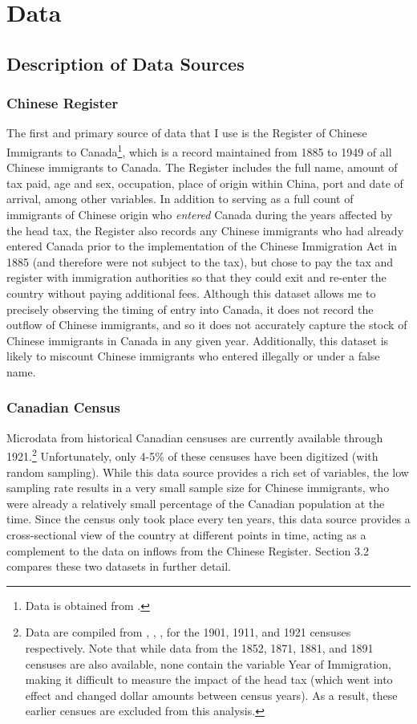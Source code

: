 \section{Data}
\subsection{Description of Data Sources}

\subsubsection{Chinese Register}
The first and primary source of data that I use is the Register of Chinese Immigrants to Canada\footnote{Data is obtained from \citet{chineseregister}.}, 
which is a record maintained from 1885 to 1949 of all Chinese immigrants to Canada.
The Register includes the full name, amount of tax paid, age and sex, occupation, place of origin within China, port and date of arrival, among other variables. 
In addition to serving as a full count of immigrants of Chinese origin who \textit{entered} Canada during the years affected by the head tax,
the Register also records any Chinese immigrants who had already entered Canada prior to the implementation of the Chinese Immigration Act in 1885 (and therefore were not subject to the tax),
but chose to pay the tax and register with immigration authorities so that they could exit and re-enter the country without paying additional fees.
Although this dataset allows me to precisely observing the timing of entry into Canada, it does not record the outflow of Chinese immigrants, and so it does not accurately capture the stock of Chinese immigrants in Canada in any given year.
Additionally, this dataset is likely to miscount Chinese immigrants who entered illegally or under a false name.

\subsubsection{Canadian Census}
Microdata from historical Canadian censuses are currently available through 1921.\footnote{Data are compiled from \citet{census1901}, \citet{census1911}, \citet{census1921}, for the 1901, 1911, and 1921 censuses respectively. Note that while data from the 1852, 1871, 1881, and 1891 censuses are also available, none contain the variable Year of Immigration, making it difficult to measure the impact of the head tax (which went into effect and changed dollar amounts between census years). As a result, these earlier censues are excluded from this analysis.} 
Unfortunately, only 4-5\% of these censuses have been digitized (with random sampling). While this data source provides a rich set of variables, the low sampling rate results in a very small sample size for Chinese immigrants, who were already a relatively small percentage of the Canadian population at the time. 
Since the census only took place every ten years, this data source provides a cross-sectional view of the country at different points in time, acting as a complement to the data on inflows from the Chinese Register.
Section 3.2 compares these two datasets in further detail.

